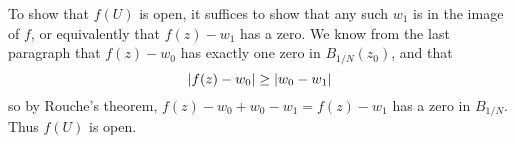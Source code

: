 \documentclass{homework}
\begin{document}
\begin{solution}
                                                                                                                                                                                                                To show that $f(U)$ is open, it suffices to show that any such $w_1$ is in the image of $f$, or equivalently that $f(z) - w_1$ has a zero. We know from the last paragraph that $f(z)-w_0$ has exactly one zero in $B_{1/N}(z_0)$, and that 
                                                                                                                                                                                                                \[
                                                                                                                                                                                                                \left|f(z) - w_0\right| \geq \left|w_0 - w_1\right|
                                                                                                                                                                                                                \]
                                                                                                                                                                                                                so by Rouche's theorem, $f(z)-w_0 +w_0-w_1 = f(z) - w_1$ has a zero in $B_{1/N}$. Thus $f(U)$ is open.
                                                                                                                                                                                                                \end{solution}


                                                                                                                                                                                                                
\end{document}
